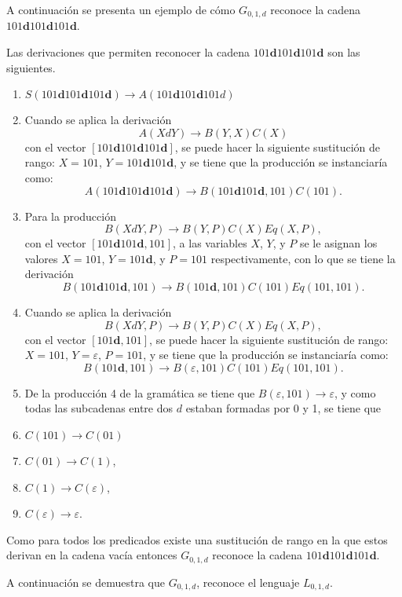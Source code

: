 \documentclass[12pt]{article}
\begin{document}
A continuación se presenta un ejemplo de cómo $G_{0,1,d}$ reconoce la cadena $101\mathbf{d}101\mathbf{d}101\mathbf{d}$.

Las derivaciones que permiten reconocer la cadena $101\mathbf{d}101\mathbf{d}101\mathbf{d}$ son las siguientes.


\begin{enumerate}
    \item $S(101\mathbf{d}101\mathbf{d}101\mathbf{d}) \to A(101\mathbf{d}101\mathbf{d}101d)$
    \item Cuando se aplica la derivación
          $$A(XdY)\to B(Y,X)C(X)$$
          con el vector  $[101\mathbf{d}101\mathbf{d}101\mathbf{d}]$, se puede hacer la siguiente sustitución de rango: $X=101$, $Y=101\mathbf{d}101\mathbf{d}$, y se tiene que la producción se instanciaría como:
          $$A(101\mathbf{d}101\mathbf{d}101\mathbf{d}) \to B(101\mathbf{d}101\mathbf{d},101)C(101).$$
    \item Para la producción $$B(XdY,P)\to B(Y,P) C(X) Eq(X,P),$$
          con el vector $[101\mathbf{d}101\mathbf{d},101]$, a las variables $X$, $Y$, y $P$ se le asignan los valores $X=101$, $Y=101\mathbf{d}$, y $P=101$ respectivamente, con lo que se tiene la derivación 
          $$B(101\mathbf{d}101\mathbf{d},101) \to B(101\mathbf{d},101)C(101)Eq(101,101).$$
    \item Cuando se aplica la derivación
          $$B(XdY,P)\to B(Y,P) C(X) Eq(X,P),$$
          con el vector $[101\mathbf{d},101]$, se puede hacer la siguiente sustitución de rango: $X=101$, $Y=\varepsilon$, $P=101$, y se tiene que la producción se instanciaría como:
          $$B(101\mathbf{d},101) \to B(\varepsilon,101)C(101)Eq(101,101).$$
    \item De la producción 4 de la gramática se tiene que $B(\varepsilon,101) \to \varepsilon$, y como todas las subcadenas entre dos $d$ estaban formadas por 0 y 1, se tiene que
    \item $C(101)\to C(01)$
    \item $C(01)\to C(1)$,
    \item $C(1)\to C(\varepsilon)$,
    \item $C(\varepsilon)\to \varepsilon$.
\end{enumerate}

Como para todos los predicados existe una sustitución de rango en la que estos derivan en la cadena vacía entonces  $G_{0,1,d}$ reconoce la cadena $101\mathbf{d}101\mathbf{d}101\mathbf{d}$.

A continuación se demuestra que $G_{0,1,d}$, reconoce el lenguaje $L_{0,1,d}$.
\end{document}
